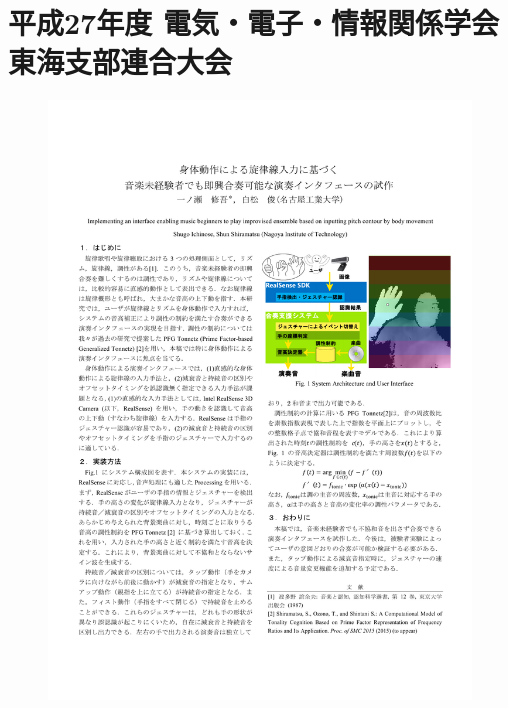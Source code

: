 \cleardoublepage
\chapter{平成27年度 電気・電子・情報関係学会 東海支部連合大会}
\begin{figure}[ht]
    \begin{center}
        \includegraphics[width=1.0\linewidth]{assets/pdf/ichinose2015tokai0717.pdf}
    \end{center}
\end{figure}

\clearpage
